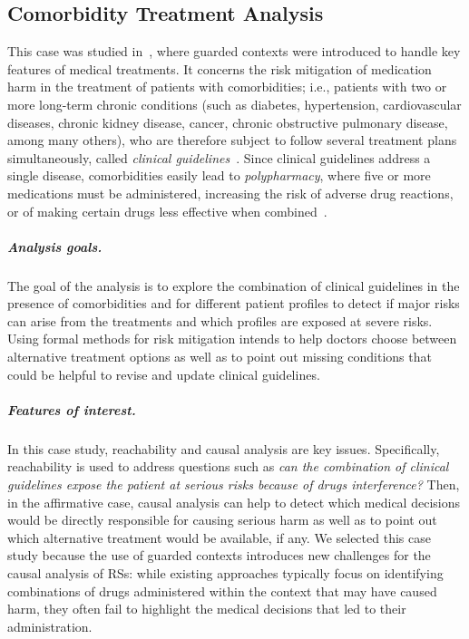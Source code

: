
\subsection{Comorbidity Treatment Analysis}\label{sec:cmsb2024}

This case was studied in~\cite{DBLP:conf/cmsb/BowlesBBFGM24}, where guarded contexts were introduced to handle key features of medical treatments. It concerns the risk mitigation of medication harm in the treatment of patients with comorbidities; i.e., patients with two or more long-term chronic conditions (such as diabetes, hypertension, cardiovascular diseases, chronic kidney disease, cancer, chronic obstructive pulmonary disease, among many others), who are therefore subject to follow several treatment plans simultaneously, called \emph{clinical guidelines}~\cite{feder1999using,woolf1999potential}. Since clinical guidelines address a single disease, comorbidities easily lead to  \emph{polypharmacy}, where five or more medications must be administered, increasing the risk of adverse drug reactions, or of making certain drugs less effective when combined~\cite{Gut12}. 

\subparagraph*{Analysis goals.}
The goal of the analysis is to explore the combination of clinical guidelines in the presence of comorbidities and for different patient profiles to detect if major risks can arise from the treatments and which profiles are exposed at severe risks.
Using formal methods for risk mitigation intends to help doctors choose between alternative treatment options as well as to point out missing conditions that could be helpful to revise and update clinical guidelines. 

\subparagraph*{Features of interest.}
In this case study, reachability and causal analysis are key issues.
Specifically, reachability is used to address questions such as \emph{can the combination of clinical guidelines expose the patient at serious risks because of drugs interference?}
Then, in the affirmative case, causal analysis can help to detect which medical decisions would be directly responsible for causing serious harm as well as to point out  which alternative treatment would be available, if any.
We selected this case study because the use of guarded contexts introduces new challenges for the causal analysis of RSs: while existing approaches typically focus on identifying combinations of drugs administered within the context that may have caused harm, they often fail to highlight the medical decisions that led to their administration.

